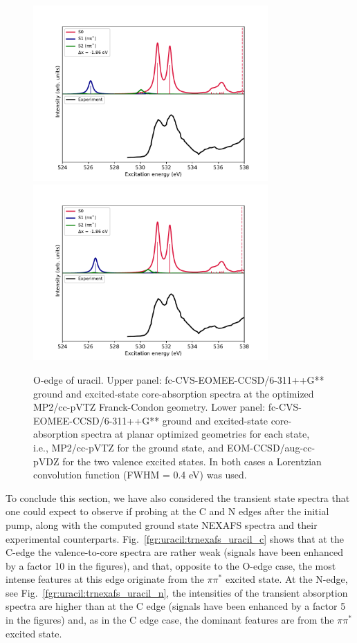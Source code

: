 \documentclass[journal=jctcce,manuscript=article]{achemso}
\begin{document}
\begin{figure}[H]
\includegraphics[width=0.8\textwidth]{Spectra/FC_Uracil_Sn_O.pdf}\\
\includegraphics[width=0.8\textwidth]{Spectra/Opt_Uracil_Sn_O.pdf}
\caption{O-edge of uracil. 
Upper panel: fc-CVS-EOMEE-CCSD/6-311++G** ground and excited-state core-absorption spectra at the optimized MP2/cc-pVTZ Franck-Condon geometry. 
Lower panel: fc-CVS-EOMEE-CCSD/6-311++G** ground and excited-state core-absorption spectra at planar optimized geometries for each state, i.e., MP2/cc-pVTZ for the ground state, and EOM-CCSD/aug-cc-pVDZ for the two valence excited states. In both cases a Lorentzian convolution function (FWHM = 0.4 eV) was used.
\label{fgr:uracil:trnexafs_uracil_o:MP2CCSD}}
\end{figure}


To conclude this section, we have also considered the transient state spectra that one could expect to observe if probing at the C and N edges after the initial pump, along with the computed ground state NEXAFS spectra and their experimental counterparts.  
Fig.~\ref{fgr:uracil:trnexafs_uracil_c} shows that at the C-edge the valence-to-core spectra
are rather weak (signals have been enhanced by a factor 10 in the figures),
and that, opposite to the O-edge case, 
the most intense features at this edge originate from the $\pi\pi^*$ excited state.
At the N-edge, see Fig.~\ref{fgr:uracil:trnexafs_uracil_n},
the intensities of the transient absorption spectra are higher than
at the C edge (signals have been enhanced by a factor 5 in the figures)
and, as in the C edge case, the dominant features are from 
the $\pi\pi^*$ excited state. 
\end{document}
